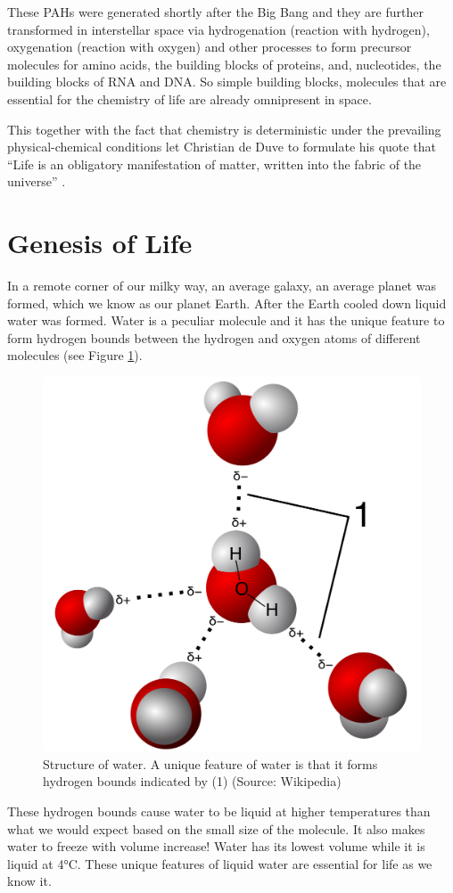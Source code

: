 \documentclass[
  11pt,
]{book}
\begin{document}
These PAHs were generated shortly after the Big Bang and they are further transformed in interstellar space via hydrogenation (reaction with hydrogen), oxygenation (reaction with oxygen) and other processes to form precursor molecules for amino acids, the building blocks of proteins, and, nucleotides, the building blocks of RNA and DNA. So simple building blocks, molecules that are essential for the chemistry of life are already omnipresent in space.

This together with the fact that chemistry is deterministic under the prevailing physical-chemical conditions let Christian de Duve to formulate his quote that ``Life is an obligatory manifestation of matter, written into the fabric of the universe'' \citep{deDuve2002}.

\hypertarget{genesis-of-life}{%
\section{Genesis of Life}\label{genesis-of-life}}

In a remote corner of our milky way, an average galaxy, an average planet was formed, which we know as our planet Earth.
After the Earth cooled down liquid water was formed. Water is a peculiar molecule and it has the unique feature to form hydrogen bounds between the hydrogen and oxygen atoms of different molecules (see Figure \ref{fig:water}).

\begin{figure}

{\centering \includegraphics[width=0.25\linewidth]{./figs/3D_model_hydrogen_bonds_in_water} 

}

\caption{Structure of water. A unique feature of water is that it forms hydrogen bounds indicated by (1) (Source: Wikipedia)}\label{fig:water}
\end{figure}

These hydrogen bounds cause water to be liquid at higher temperatures than what we would expect based on the small size of the molecule. It also makes water to freeze with volume increase! Water has its lowest volume while it is liquid at 4°C. These unique features of liquid water are essential for life as we know it.
\end{document}
